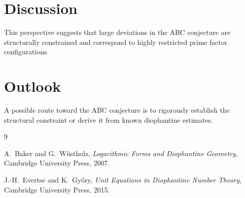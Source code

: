 \documentclass{article}
\begin{document}
	\section{Discussion}
	
	This perspective suggests that large deviations in the ABC conjecture
	are structurally constrained and correspond to highly restricted
	prime factor configurations.
	
	\section{Outlook}
	
	A possible route toward the ABC conjecture is to rigorously establish
	the structural constraint or derive it from known diophantine estimates.
	
	\begin{thebibliography}{9}
		
		A.~Baker and G.~W\"ustholz,
		\textit{Logarithmic Forms and Diophantine Geometry},
		Cambridge University Press, 2007.
		
		J.-H.~Evertse and K.~Gy\H{o}ry,
		\textit{Unit Equations in Diophantine Number Theory},
		Cambridge University Press, 2015.
		
	\end{thebibliography}
	
\end{document}
